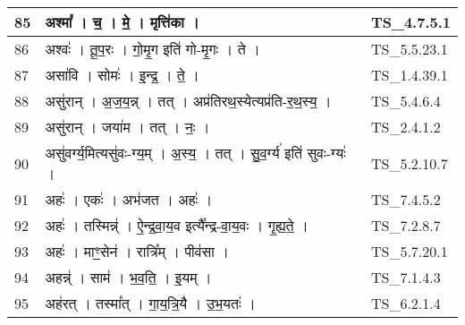\documentclass[17pt]{extarticle}
\begin{document}
\begin{longtable}{||p{0.4in}||p{4.9in}||p{0.9in}||}
    \hline
        
    85 & अश्मा᳚   ।   च॒   ।   मे॒   ।   मृत्ति॑का   ।    & TS\_4.7.5.1       \\
    
    \hline
        
    86 & अश्वः॑   ।   तू॒प॒रः   ।   गो॒मृ॒ग इति॑ गो{-}मृ॒गः   ।   ते   ।    & TS\_5.5.23.1       \\
    
    \hline
        
    87 & असा॑वि   ।   सोमः॑   ।   इ॒न्द्र॒   ।   ते॒   ।    & TS\_1.4.39.1       \\
    
    \hline
        
    88 & असु॑रान्   ।   अ॒ज॒य॒न्न्   ।   तत्   ।   अप्र॑तिरथ॒स्येत्यप्र॑ति{-}र॒थ॒स्य॒   ।    & TS\_5.4.6.4       \\
    
    \hline
        
    89 & असु॑रान्   ।   जया॑म   ।   तत्   ।   नः॒   ।    & TS\_2.4.1.2       \\
    
    \hline
        
    90 & असु॑वर्ग्य॒मित्यसु॑वः{-}ग्य॒म्   ।   अ॒स्य॒   ।   तत्   ।   सु॒व॒र्ग्य॑ इति॑ सुवः{-}ग्यः॑   ।    & TS\_5.2.10.7       \\
    
    \hline
        
    91 & अहः॑   ।   एकः॑   ।   अभ॑जत   ।   अहः॑   ।    & TS\_7.4.5.2       \\
    
    \hline
        
    92 & अहः॑   ।   तस्मिन्न्॑   ।   ऐ॒न्द्र॒वा॒य॒व इत्यै᳚न्द्र{-}वा॒य॒वः   ।   गृ॒ह्य॒ते॒   ।    & TS\_7.2.8.7       \\
    
    \hline
        
    93 & अहः॑   ।   माꣳ॒॒सेन॑   ।   रात्रि᳚म्   ।   पीव॑सा   ।    & TS\_5.7.20.1       \\
    
    \hline
        
    94 & अहन्न्॑   ।   साम॑   ।   भ॒व॒ति॒   ।   इ॒यम्   ।    & TS\_7.1.4.3       \\
    
    \hline
        
    95 & अह॑रत्   ।   तस्मा᳚त्   ।   गा॒य॒त्रि॒यै   ।   उ॒भ॒यतः॑   ।    & TS\_6.2.1.4       \\
    

\end{longtable}
\end{document}
